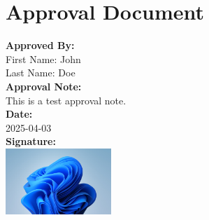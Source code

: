 \documentclass{article}
\begin{document}
\section*{Approval Document}

\noindent \textbf{Approved By:} \\
First Name: John \\
Last Name: Doe \\[10pt]

\noindent \textbf{Approval Note:} \\
This is a test approval note. \\[10pt]

\noindent \textbf{Date:} \\
2025-04-03 \\[20pt]

\noindent \textbf{Signature:} \\
\includegraphics[width=0.3\textwidth]{../uploads/default_signature.png}
\end{document}
